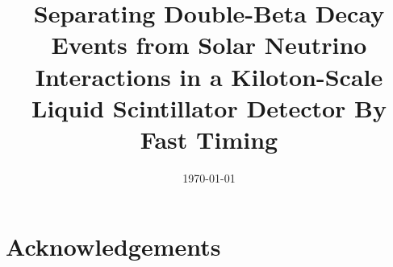 



\graphicspath{{figs/}}

\linenumbers
{}
%

\large

\title{Separating Double-Beta Decay Events from Solar Neutrino
Interactions in a Kiloton-Scale Liquid Scintillator Detector By Fast Timing}


\begin{abstract}

\end{abstract}

\date{\today}

\maketitle

\clearpage
\tableofcontents

\linenumbers\relax %
\clearpage







\section*{Acknowledgements}



\clearpage

\appendix
\renewcommand*{\thesection}{\Alph{section}}


\clearpage



%
%
%
%
%
%
%





%
%


%

